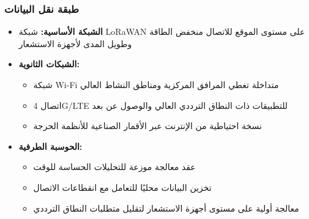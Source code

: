 \subsubsection{طبقة نقل البيانات}
\begin{itemize}
    \item \textbf{الشبكة الأساسية:} شبكة LoRaWAN على مستوى الموقع للاتصال منخفض الطاقة وطويل المدى لأجهزة الاستشعار
    
    \item \textbf{الشبكات الثانوية:}
    \begin{itemize}
        \item شبكة Wi-Fi متداخلة تغطي المرافق المركزية ومناطق النشاط العالي
        \item اتصال 4G/LTE للتطبيقات ذات النطاق الترددي العالي والوصول عن بعد
        \item نسخة احتياطية من الإنترنت عبر الأقمار الصناعية للأنظمة الحرجة
    \end{itemize}
    
    \item \textbf{الحوسبة الطرفية:}
    \begin{itemize}
        \item عقد معالجة موزعة للتحليلات الحساسة للوقت
        \item تخزين البيانات محليًا للتعامل مع انقطاعات الاتصال
        \item معالجة أولية على مستوى أجهزة الاستشعار لتقليل متطلبات النطاق الترددي
    \end{itemize}
\end{itemize}

